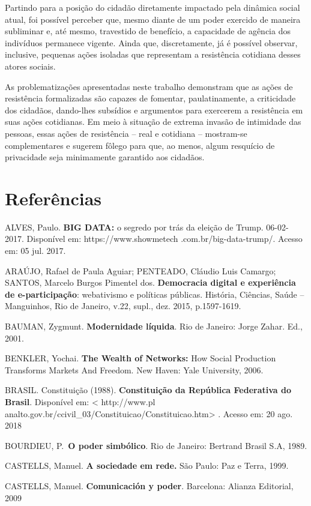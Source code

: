 Partindo para a posição do cidadão diretamente impactado pela dinâmica
social atual, foi possível perceber que, mesmo diante de um poder
exercido de maneira subliminar e, até mesmo, travestido de benefício, a
capacidade de agência dos indivíduos permanece vigente. Ainda que,
discretamente, já é possível observar, inclusive, pequenas ações
isoladas que representam a resistência cotidiana desses atores sociais.

As problematizações apresentadas neste trabalho demonstram que as ações
de resistência formalizadas são capazes de fomentar, paulatinamente, a
criticidade dos cidadãos, dando-lhes subsídios e argumentos para
exercerem a resistência em suas ações cotidianas. Em meio à situação de
extrema invasão de intimidade das pessoas, essas ações de resistência --
real e cotidiana -- mostram-se complementares e sugerem fôlego para que,
ao menos, algum resquício de privacidade seja minimamente garantido aos
cidadãos.

\section{Referências}

ALVES, Paulo. \textbf{BIG DATA:} o segredo por trás da eleição de Trump.
06-02-2017. Disponível em:
https://www.showmetech
.com.br/big-data-trump/. Acesso em: 05 jul. 2017.

ARAÚJO, Rafael de Paula Aguiar; PENTEADO, Cláudio Luis Camargo; SANTOS,
Marcelo Burgos Pimentel dos. \textbf{Democracia digital e experiência de
e-participação}: webativismo e políticas públicas. História, Ciências,
Saúde -- Manguinhos, Rio de Janeiro, v.22, supl., dez. 2015,
p.1597-1619.

BAUMAN, Zygmunt. \textbf{Modernidade líquida}. Rio de Janeiro: Jorge
Zahar. Ed., 2001.

BENKLER, Yochai. \textbf{The Wealth of Networks:} How Social Production
Transforms Markets And Freedom. New Haven: Yale University, 2006.

BRASIL. Constituição (1988). \textbf{Constituição da República
Federativa do Brasil}. Disponível em: \textless{}
http://www.pl
analto.gov.br/ccivil\_03/Constituicao/Constituicao.htm\textgreater{}
. Acesso em: 20 ago. 2018

BOURDIEU, P.~\textbf{O poder simbólico}. Rio de Janeiro: Bertrand Brasil
S.A, 1989.

CASTELLS, Manuel. \textbf{A sociedade em rede.} São Paulo: Paz e Terra,
1999.

CASTELLS, Manuel. \textbf{Comunicación y poder}. Barcelona: Alianza
Editorial, 2009

